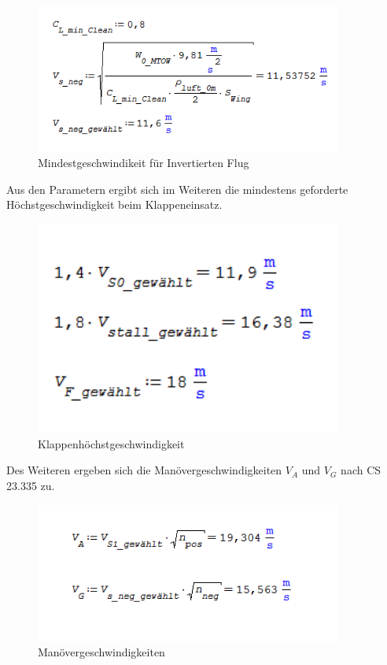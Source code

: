 \begin{figure}[H]
\centering
\includegraphics[width=0.9\textwidth]{bilder/Formeln/VS_neg.png}
\caption{Mindestgeschwindikeit für Invertierten Flug} 
\label{fig:Mindestgeschwindikeit für Invertierten Flug}
\end{figure}

Aus den Parametern ergibt sich im Weiteren die mindestens geforderte Höchstgeschwindigkeit beim Klappeneinsatz.

\begin{figure}[H]
\centering
\includegraphics[width=0.9\textwidth]{bilder/Formeln/VF.png}
\caption{Klappenhöchstgeschwindigkeit} 
\label{fig:Klappenhöchstgeschwindigkeit}
\end{figure}

Des Weiteren ergeben sich die Manövergeschwindigkeiten $V_{A}$ und $V_{G}$ nach CS 23.335 zu.


\begin{figure}[H]
\centering
\includegraphics[width=0.9\textwidth]{bilder/Formeln/V_g.png}
\caption{Manövergeschwindigkeiten} 
\label{fig:Manövergeschwindigkeiten}
\end{figure}


